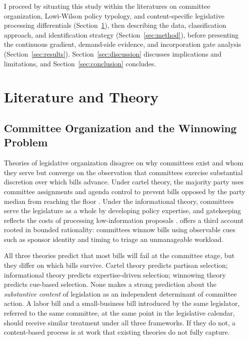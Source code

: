 \documentclass[11pt]{article}
\begin{document}
I proceed by situating this study within the literatures on committee organization, Lowi-Wilson policy typology, and content-specific legislative processing differentials (Section~\ref{sec:lit}), then describing the data, classification approach, and identification strategy (Section~\ref{sec:method}), before presenting the continuous gradient, demand-side evidence, and incorporation gate analysis (Section~\ref{sec:results}). Section~\ref{sec:discussion} discusses implications and limitations, and Section~\ref{sec:conclusion} concludes.


\section{Literature and Theory}
\label{sec:lit}

\subsection{Committee Organization and the Winnowing Problem}

Theories of legislative organization disagree on why committees exist and whom they serve but converge on the observation that committees exercise substantial discretion over which bills advance. Under cartel theory, the majority party uses committee assignments and agenda control to prevent bills opposed by the party median from reaching the floor \citep{cox2005}. Under the informational theory, committees serve the legislature as a whole by developing policy expertise, and gatekeeping reflects the costs of processing low-information proposals \citep{krehbiel1991}. \citet{krutz2005} offers a third account rooted in bounded rationality: committees winnow bills using observable cues such as sponsor identity and timing to triage an unmanageable workload.

All three theories predict that most bills will fail at the committee stage, but they differ on which bills survive. Cartel theory predicts partisan selection; informational theory predicts expertise-driven selection; winnowing theory predicts cue-based selection. None makes a strong prediction about the \emph{substantive content} of legislation as an independent determinant of committee action. A labor bill and a small-business bill introduced by the same legislator, referred to the same committee, at the same point in the legislative calendar, should receive similar treatment under all three frameworks. If they do not, a content-based process is at work that existing theories do not fully capture.
\end{document}
